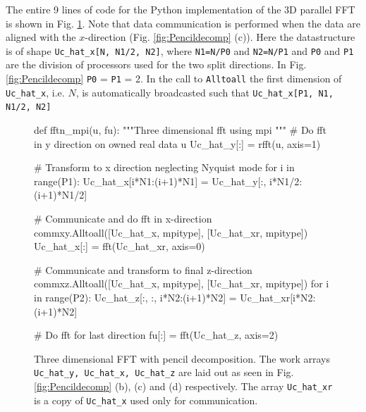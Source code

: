 \documentclass[11pt, oneside]{article}
\newcommand{\inpyth}{\lstinline[style=pythonstyle, basicstyle=\ttfamily]} %[]%
\begin{document}
The entire 9 lines of code for the Python implementation of the 3D parallel FFT is shown in Fig. \ref{fig:fftn_mpi_pencil}. Note that data communication is performed when the data are aligned with the $x$-direction (Fig. \ref{fig:Pencildecomp} (c)). Here the datastructure is of shape \inpyth{Uc_hat_x[N, N1/2, N2]}, where \inpyth{N1=N/P0} and \inpyth{N2=N/P1} and \inpyth{P0} and \inpyth{P1} are the division of processors used for the two split directions. In Fig. \ref{fig:Pencildecomp} \inpyth{P0} = \inpyth{P1} = 2. In the call to \inpyth{Alltoall} the first dimension of \inpyth{Uc_hat_x}, i.e. $N$, is automatically broadcasted such that \inpyth{Uc_hat_x[P1, N1, N1/2, N2]}

\begin{figure}
\begin{python}
def fftn_mpi(u, fu):
    """Three dimensional fft using mpi
    """
    # Do fft in y direction on owned real data u
    Uc_hat_y[:] = rfft(u, axis=1)

    # Transform to x direction neglecting Nyquist mode
    for i in range(P1):
        Uc_hat_x[i*N1:(i+1)*N1] = Uc_hat_y[:, i*N1/2:(i+1)*N1/2]

    # Communicate and do fft in x-direction
    commxy.Alltoall([Uc_hat_x, mpitype], [Uc_hat_xr, mpitype])
    Uc_hat_x[:] = fft(Uc_hat_xr, axis=0)

    # Communicate and transform to final z-direction
    commxz.Alltoall([Uc_hat_x, mpitype], [Uc_hat_xr, mpitype])
    for i in range(P2):
        Uc_hat_z[:, :, i*N2:(i+1)*N2] = Uc_hat_xr[i*N2:(i+1)*N2]

    # Do fft for last direction
    fu[:] = fft(Uc_hat_z, axis=2)

\end{python}
\caption{Three dimensional FFT with pencil decomposition. The work arrays \inpyth{Uc_hat_y, Uc_hat_x, Uc_hat_z} are laid out as seen in Fig. \ref{fig:Pencildecomp} (b), (c) and (d) respectively. The array \inpyth{Uc_hat_xr} is a copy of \inpyth{Uc_hat_x} used only for communication.}
\label{fig:fftn_mpi_pencil}
\end{figure}


\appendix
\end{document}
